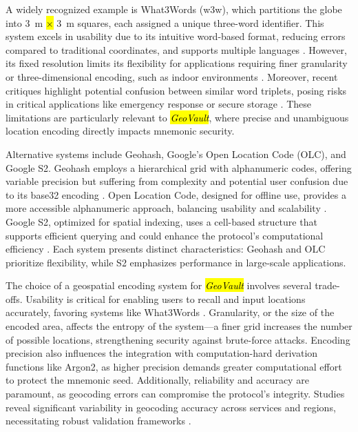 \documentclass[mathematics,article,accept,pdftex,moreauthors]{Definitions/mdpi}
\begin{document}
A widely recognized example is What3Words (w3w), which partitions the globe into 3~m \hl{$\times$} %
 3~m squares, each assigned a unique three-word identifier. This system excels in usability due to its intuitive word-based format, reducing errors compared to traditional coordinates, and supports multiple languages \cite{Jiang2018a}. However, its fixed resolution limits its flexibility for applications requiring finer granularity or three-dimensional encoding, such as indoor environments \cite{Lee2009}. Moreover, recent critiques highlight potential confusion between similar word triplets, posing risks in critical applications like emergency response or secure storage \cite{Arthur2023}. These limitations are particularly relevant to \textit{\hl{GeoVault}}, where precise and unambiguous location encoding directly impacts mnemonic security.

Alternative systems include Geohash, Google's Open Location Code (OLC), and Google S2. Geohash employs a hierarchical grid with alphanumeric codes, offering variable precision but suffering from complexity and potential user confusion due to its base32 encoding \cite{Mai2022}. Open Location Code, designed for offline use, provides a more accessible alphanumeric approach, balancing usability and scalability \cite{Mai2022}. Google S2, optimized for spatial indexing, uses a cell-based structure that supports efficient querying and could enhance the protocol's computational efficiency \cite{Mai2022}. Each system presents distinct characteristics: Geohash and OLC prioritize flexibility, while S2 emphasizes performance in large-scale applications.

The choice of a geospatial encoding system for \textit{\hl{GeoVault}} involves several trade-offs. Usability is critical for enabling users to recall and input locations accurately, favoring systems like What3Words \cite{Jiang2018a}. Granularity, or the size of the encoded area, affects the entropy of the system---a finer grid increases the number of possible locations, strengthening security against brute-force attacks. Encoding precision also influences the integration with computation-hard derivation functions like Argon2, as higher precision demands greater computational effort to protect the mnemonic seed. Additionally, reliability and accuracy are paramount, as geocoding errors can compromise the protocol's integrity. Studies reveal significant variability in geocoding accuracy across services and regions, necessitating robust validation frameworks \cite{Goldberg2013, Zandbergen2008a}.
\end{document}
